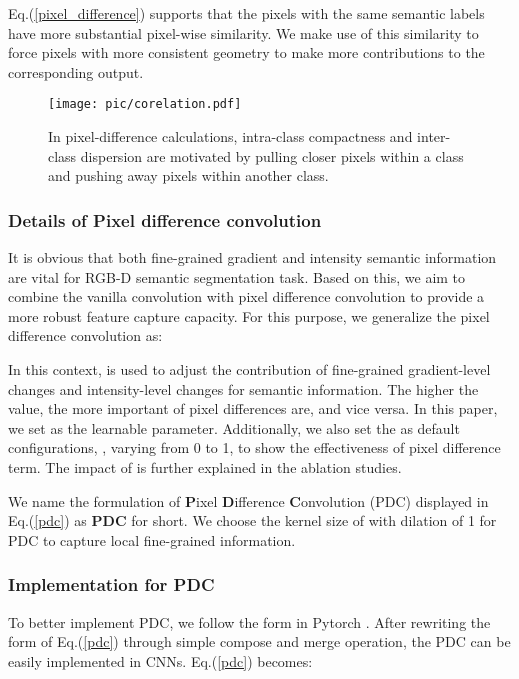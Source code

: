 \documentclass[lettersize,journal]{IEEEtran}
\begin{document}
Eq.(\ref{pixel_difference}) supports that the pixels with the same semantic labels have more substantial pixel-wise similarity. We make use of this similarity to force pixels with more consistent geometry to make more contributions to the corresponding output. 

\begin{figure}
    \centering
    \texttt{[image: pic/corelation.pdf]}
    \caption{In pixel-difference calculations, intra-class compactness and inter-class dispersion are motivated by pulling closer pixels within a class and pushing away pixels within another class.}
    \label{difference}
\end{figure}


\subsubsection{Details of Pixel difference convolution}
It is obvious that both fine-grained gradient and intensity semantic information are vital for RGB-D semantic segmentation task. Based on this, we aim to combine the vanilla convolution with pixel difference convolution to provide a more robust feature capture capacity. For this purpose, we generalize the pixel difference convolution as: 



In this context,  is used to adjust the contribution of fine-grained gradient-level changes and intensity-level changes for semantic information. The higher the  value, the more important of pixel differences are, and vice versa. In this paper, we set  as the learnable parameter. Additionally, we also set the  as default configurations, , varying from 0 to 1, to show the effectiveness of pixel difference term. The impact of  is further explained in the ablation studies.

We name the formulation of \textbf{P}ixel \textbf{D}ifference \textbf{C}onvolution (PDC) displayed in Eq.(\ref{pdc}) as \textbf{PDC} for short. 
We choose the kernel size of  with dilation of 1 for PDC to capture local fine-grained information.
\subsubsection{Implementation for PDC} To better implement PDC, we follow the form in Pytorch \cite{yu2020searching}.
After rewriting the form of Eq.(\ref{pdc}) through simple compose and merge operation, the PDC can be easily implemented in CNNs. Eq.(\ref{pdc}) becomes:
\end{document}
